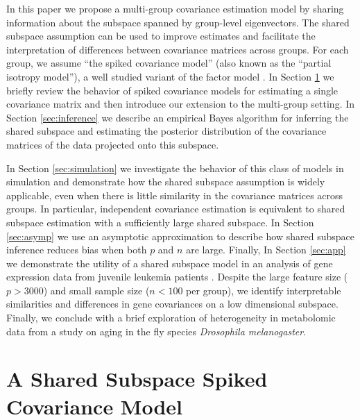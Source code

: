 \documentclass[12pt]{article}
\begin{document}
In this paper we propose a multi-group covariance estimation model by
sharing information about the subspace spanned by group-level
eigenvectors.  The shared subspace assumption can be used to improve
estimates and facilitate the interpretation of differences between
covariance matrices across groups.  For each group, we assume ``the
spiked covariance model'' (also known as the ``partial isotropy
model''), a well studied variant of the factor model
\citep{Mardia1980, Johnstone2001}.  In Section \ref{sec:shared} we
briefly review the behavior of spiked covariance models for estimating
a single covariance matrix and then introduce our extension to the
multi-group setting.  In Section \ref{sec:inference} we describe an
empirical Bayes algorithm for inferring the shared subspace and
estimating the posterior distribution of the covariance matrices of
the data projected onto this subspace.  

In Section \ref{sec:simulation} we investigate the behavior of this
class of models in simulation and demonstrate how the shared subspace
assumption is widely applicable, even when there is little similarity
in the covariance matrices across groups.  In particular, independent
covariance estimation is equivalent to shared subspace estimation with
a sufficiently large shared subspace.  In Section \ref{sec:asymp} we
use an asymptotic approximation to describe how shared subspace
inference reduces bias when both $p$ and $n$ are large.  Finally, In
Section \ref{sec:app} we demonstrate the utility of a shared subspace
model in an analysis of gene expression data from juvenile leukemia
patients .  Despite the large feature size ($p > 3000$) and small
sample size ($n < 100$ per group), we identify interpretable
similarities and differences in gene covariances on a low dimensional
subspace.  Finally, we conclude with a brief exploration of
heterogeneity in metabolomic data from a study on aging in the fly
species \textit{Drosophila melanogaster}.

\section{A Shared Subspace Spiked Covariance Model}
\label{sec:shared}

\end{document}
